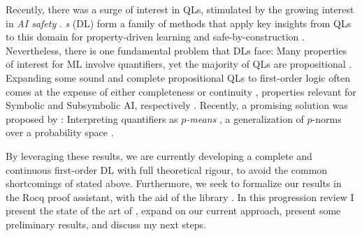 Recently, there was a surge of interest in QLs, stimulated by the growing interest in \emph{AI safety} \mcita{}. \emph{\DL{}s} (DL) form a family of methods that apply key insights from QLs to this domain for property-driven learning and safe-by-construction \InAI{} \mcita{}. Nevertheless, there is one fundamental problem that DLs face: Many properties of interest for ML involve quantifiers, yet the majority of QLs are propositional \mcita{}.  Expanding some sound and complete propositional QLs to first-order logic often comes at the expense of either completeness or continuity \mcita{}, properties relevant for Symbolic and Subsymbolic AI, respectively \mcita{}.  Recently, a promising solution was proposed by \mcita{}: Interpreting quantifiers as \textit{$p$-means} \mcita{}, a generalization of $p$-norms over a probability space \mcita{}.  

By leveraging these results, we are currently developing a complete and continuous first-order DL with full theoretical rigour, to avoid the common shortcomings  of \InAI{} stated above. Furthermore, we seek to formalize our results in the Rocq proof assistant, with the aid of the \mathcomp{} library \mcita{}. In this progression review I present the state of the art of \yada, expand on our current approach, present some preliminary results,  and discuss my next steps. 


